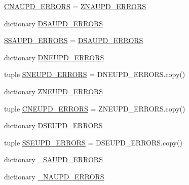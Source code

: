\begin{DoxyCompactItemize}
\item 
\hyperlink{namespacescipy_1_1sparse_1_1linalg_1_1eigen_1_1arpack_1_1arpack_afc1bb42d525e296e846b507449b2e9bf}{C\+N\+A\+U\+P\+D\+\_\+\+E\+R\+R\+O\+R\+S} = \hyperlink{namespacescipy_1_1sparse_1_1linalg_1_1eigen_1_1arpack_1_1arpack_ab93c60eb0f00c8d58982d9efe6a47054}{Z\+N\+A\+U\+P\+D\+\_\+\+E\+R\+R\+O\+R\+S}
\item 
dictionary \hyperlink{namespacescipy_1_1sparse_1_1linalg_1_1eigen_1_1arpack_1_1arpack_adf9bcdbc9991ef550abf43a51d8b8ef6}{D\+S\+A\+U\+P\+D\+\_\+\+E\+R\+R\+O\+R\+S}
\item 
\hyperlink{namespacescipy_1_1sparse_1_1linalg_1_1eigen_1_1arpack_1_1arpack_a66ad844229baf74730562841cd7a2861}{S\+S\+A\+U\+P\+D\+\_\+\+E\+R\+R\+O\+R\+S} = \hyperlink{namespacescipy_1_1sparse_1_1linalg_1_1eigen_1_1arpack_1_1arpack_adf9bcdbc9991ef550abf43a51d8b8ef6}{D\+S\+A\+U\+P\+D\+\_\+\+E\+R\+R\+O\+R\+S}
\item 
dictionary \hyperlink{namespacescipy_1_1sparse_1_1linalg_1_1eigen_1_1arpack_1_1arpack_acc370abd0cebb72befb5455f4bcdd6c0}{D\+N\+E\+U\+P\+D\+\_\+\+E\+R\+R\+O\+R\+S}
\item 
tuple \hyperlink{namespacescipy_1_1sparse_1_1linalg_1_1eigen_1_1arpack_1_1arpack_ae0e0ba7d4d5a0aa08f034eb6077dce44}{S\+N\+E\+U\+P\+D\+\_\+\+E\+R\+R\+O\+R\+S} = D\+N\+E\+U\+P\+D\+\_\+\+E\+R\+R\+O\+R\+S.\+copy()
\item 
dictionary \hyperlink{namespacescipy_1_1sparse_1_1linalg_1_1eigen_1_1arpack_1_1arpack_ab1f8aa6c7a93f7f661b4bb4c9cb3afdf}{Z\+N\+E\+U\+P\+D\+\_\+\+E\+R\+R\+O\+R\+S}
\item 
tuple \hyperlink{namespacescipy_1_1sparse_1_1linalg_1_1eigen_1_1arpack_1_1arpack_a1f2a107d74e87d4eb04ee9bd7f555550}{C\+N\+E\+U\+P\+D\+\_\+\+E\+R\+R\+O\+R\+S} = Z\+N\+E\+U\+P\+D\+\_\+\+E\+R\+R\+O\+R\+S.\+copy()
\item 
dictionary \hyperlink{namespacescipy_1_1sparse_1_1linalg_1_1eigen_1_1arpack_1_1arpack_a471a37fcb4c527bdcac4225e6dfd810e}{D\+S\+E\+U\+P\+D\+\_\+\+E\+R\+R\+O\+R\+S}
\item 
tuple \hyperlink{namespacescipy_1_1sparse_1_1linalg_1_1eigen_1_1arpack_1_1arpack_ad51d2c04614436b983d9882ba17d00cb}{S\+S\+E\+U\+P\+D\+\_\+\+E\+R\+R\+O\+R\+S} = D\+S\+E\+U\+P\+D\+\_\+\+E\+R\+R\+O\+R\+S.\+copy()
\item 
dictionary \hyperlink{namespacescipy_1_1sparse_1_1linalg_1_1eigen_1_1arpack_1_1arpack_a8753784e721713413772ed405d67a3d6}{\+\_\+\+S\+A\+U\+P\+D\+\_\+\+E\+R\+R\+O\+R\+S}
\item 
dictionary \hyperlink{namespacescipy_1_1sparse_1_1linalg_1_1eigen_1_1arpack_1_1arpack_a5ac390e6e15c9df8e90b02f1e9e5dc35}{\+\_\+\+N\+A\+U\+P\+D\+\_\+\+E\+R\+R\+O\+R\+S}

\end{DoxyCompactItemize}
